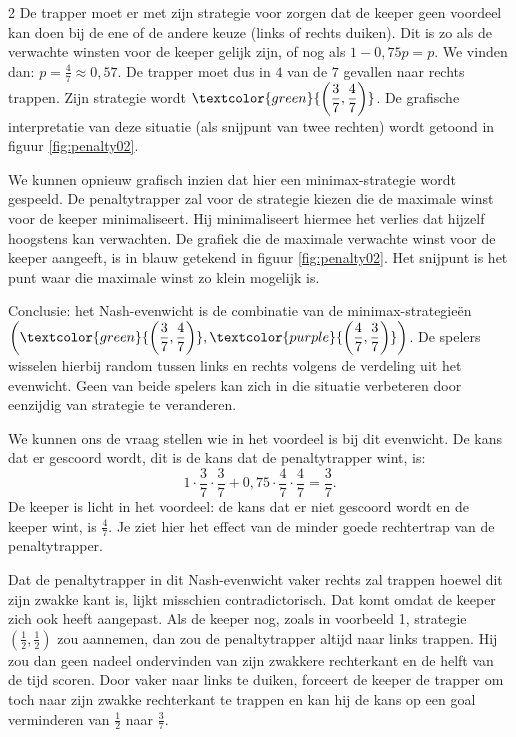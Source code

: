 \begin{multicols}{2}
De trapper moet er met zijn strategie voor zorgen dat de keeper geen voordeel kan doen bij de ene of de andere keuze (links of rechts duiken). Dit is zo als de verwachte winsten voor de keeper gelijk zijn, of nog als $1-0,75p=p$. We vinden dan: $\displaystyle p=\frac{4}{7}\approx 0,57$. De trapper moet dus in $4$ van de $7$ gevallen naar rechts trappen. Zijn strategie wordt $\displaystyle \textcolor{green}{\left(\frac{3}{7}, \frac{4}{7}\right)}$. De grafische interpretatie van deze situatie (als snijpunt van twee rechten) wordt getoond in figuur \ref{fig:penalty02}. 

We kunnen opnieuw grafisch inzien dat hier een minimax-strategie wordt gespeeld. De penaltytrapper zal voor de strategie kiezen die de maximale winst voor de keeper minimaliseert. Hij minimaliseert hiermee het verlies dat hijzelf hoogstens kan verwachten. De grafiek die de maximale verwachte winst voor de keeper aangeeft, is in blauw getekend in figuur \ref{fig:penalty02}. Het snijpunt is het punt waar die maximale winst zo klein mogelijk is.


Conclusie: het Nash-evenwicht is de combinatie van de minimax-strategieën $\displaystyle \left( \textcolor{green}{\left(\frac{3}{7},\frac{4}{7} \right)},\textcolor{purple}{\left(\frac{4}{7},\frac{3}{7} \right)}  \right)$. De spelers wisselen hierbij random tussen links en rechts volgens de verdeling uit het evenwicht. Geen van beide spelers kan zich in die situatie verbeteren door eenzijdig van strategie te veranderen.

We kunnen ons de vraag stellen wie in het voordeel is bij dit evenwicht. De kans dat er gescoord wordt, dit is de kans dat de penaltytrapper wint, is: $$1\cdot \frac{3}{7}\cdot \frac{3}{7}+0,75\cdot \frac{4}{7}\cdot \frac{4}{7}=\frac{3}{7}.$$ De keeper is licht in het voordeel: de kans dat er niet gescoord wordt en de keeper wint, is $\frac{4}{7}$. Je ziet hier het effect van de minder goede rechtertrap van de penaltytrapper. 

Dat de penaltytrapper in dit Nash-evenwicht vaker rechts zal trappen hoewel dit zijn zwakke kant is, lijkt misschien contradictorisch. Dat komt omdat de keeper zich ook heeft aangepast. Als de keeper nog, zoals in voorbeeld 1, strategie $\displaystyle \left(\frac{1}{2},\frac{1}{2}\right)$ zou aannemen, dan zou de penaltytrapper altijd naar links trappen. Hij zou dan geen nadeel ondervinden van zijn zwakkere rechterkant en de helft van de tijd scoren. Door vaker naar links te duiken, forceert de keeper de trapper om toch naar zijn zwakke rechterkant te trappen en kan hij de kans op een goal verminderen van $\frac{1}{2}$ naar $\frac{3}{7}$.


\end{multicols}
